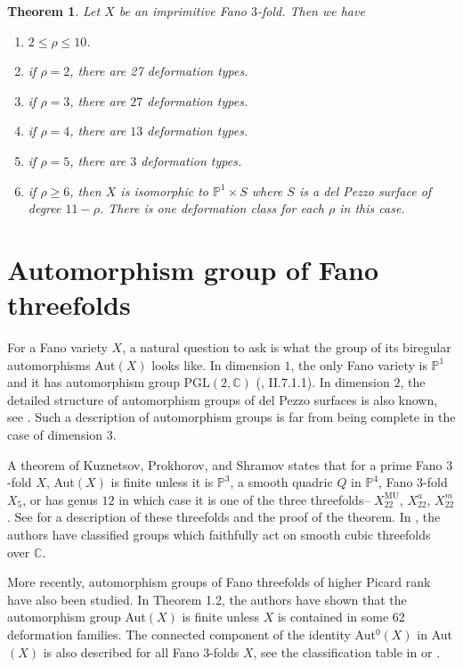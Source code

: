 \documentclass[11pt]{amsart}
\theoremstyle{plain}
\newtheorem{theorem}{Theorem}[section]
\theoremstyle{definition}
\theoremstyle{expl}
\begin{document}
    \begin{theorem}
        Let $X$ be an imprimitive Fano $3$-fold. Then we have
        \begin{enumerate}
            \item[(i)] $2\leq \rho \leq 10$.
            \item[(ii)] if $\rho =2$, there are 27 deformation types.
            \item[(iii)] if $\rho=3$, there are $27$ deformation types.
            \item[(iv)] if $\rho=4$, there are $13$ deformation types.
            \item[(v)] if $\rho=5$, there are $3$ deformation types.
            \item[(vi)] if $\rho \geq 6$, then $X$ is isomorphic to $\mathbb{P}^1 \times S$ where $S$ is a del Pezzo surface of degree $11-\rho$. There is one deformation class for each $\rho$ in this case. 
        \end{enumerate}
    \end{theorem}
    
\section{Automorphism group of Fano threefolds}
    For a Fano variety $X$, a natural question to ask is what the group of its biregular automorphisms Aut$(X)$ looks like. 
    In dimension $1$, the only Fano variety is $\mathbb{P}^1$ and it has automorphism group PGL$(2,\mathbb{C})$ (\cite{Hartshorne}, II.7.1.1). In dimension $2$, the detailed structure of automorphism groups of del Pezzo surfaces is also known, see \cite{Del}. Such a description of automorphism groups is far from being complete in the case of dimension $3$. 
    
     A theorem of Kuznetsov, Prokhorov, and Shramov states that for a prime Fano $3$-fold $X$, Aut$(X)$ is finite unless it is $\mathbb{P}^3$, a smooth quadric $Q$ in $\mathbb{P}^4$, Fano $3$-fold $X_5$, or has genus $12$ in which case it is one of the three threefolds-- $X^{\text{MU}}_{22}$, $X^a_{22}$, $X^{m}_{22}$. See \cite{Hil} for a description of these threefolds and the proof of the theorem. In \cite{Cubic}, the authors have classified groups which faithfully act on smooth cubic threefolds over $\mathbb{C}$.
    
    More recently, automorphism groups of Fano threefolds of higher Picard rank have also been studied. In \cite{Inf} Theorem 1.2, the authors have shown that the automorphism group Aut$(X)$ is finite unless $X$ is contained in some 62  deformation families. The connected component of the identity Aut$^0(X)$ in Aut$(X)$ is also described for all Fano $3$-folds $X$, see the classification table in \cite{Inf} or \cite{Fano}.
    
\end{document}
